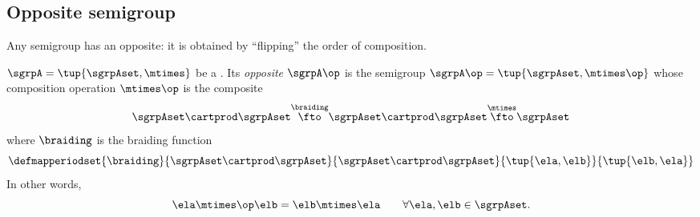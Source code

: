 
\subsection{Opposite semigroup}

Any semigroup has an opposite: it is obtained by ``flipping'' the order of composition.

\begin{definition}\label{def:opposite-semigroup}
    $\sgrpA = \tup{\sgrpAset, {{\mtimes}}}$ be a .
    Its \emph{opposite} $\sgrpA\op$ is the semigroup $\sgrpA\op = \tup{\sgrpAset, {{\mtimes \op}}}$ whose composition operation $\mtimes \op$ is the composite
    \begin{equation}
        \sgrpAset \cartprod \sgrpAset \overset{\braiding}{\fto} \sgrpAset \cartprod \sgrpAset \overset{\mtimes}{\fto} \sgrpAset
    \end{equation}
    where $\braiding$ is the braiding function
    \begin{equation}
        \defmapperiodset{
            \braiding
        }{
            \sgrpAset \cartprod \sgrpAset
        }{
            \sgrpAset \cartprod \sgrpAset
        }{
            \tup{\ela, \elb}
        }{
            \tup{\elb, \ela}
        }
    \end{equation}
    In other words,
    \begin{equation}
        \ela \mtimes \op \elb = \elb \mtimes \ela \qquad \forall \ela, \elb \in \sgrpAset.
    \end{equation}

\end{definition}

